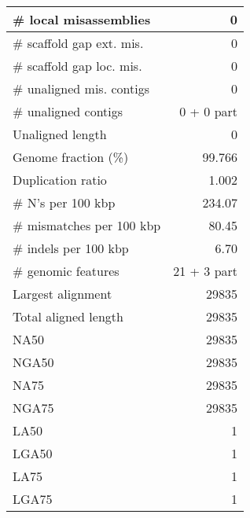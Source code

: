 \documentclass[12pt,a4paper]{article}
\begin{document}
\begin{table}[ht]
\begin{center}
\begin{tabular}{|l*{1}{|r}|}
\# local misassemblies & 0 \\ \hline
\# scaffold gap ext. mis. & 0 \\ \hline
\# scaffold gap loc. mis. & 0 \\ \hline
\# unaligned mis. contigs & 0 \\ \hline
\# unaligned contigs & 0 + 0 part \\ \hline
Unaligned length & 0 \\ \hline
Genome fraction (\%) & 99.766 \\ \hline
Duplication ratio & 1.002 \\ \hline
\# N's per 100 kbp & 234.07 \\ \hline
\# mismatches per 100 kbp & 80.45 \\ \hline
\# indels per 100 kbp & 6.70 \\ \hline
\# genomic features & 21 + 3 part \\ \hline
Largest alignment & 29835 \\ \hline
Total aligned length & 29835 \\ \hline
NA50 & 29835 \\ \hline
NGA50 & 29835 \\ \hline
NA75 & 29835 \\ \hline
NGA75 & 29835 \\ \hline
LA50 & 1 \\ \hline
LGA50 & 1 \\ \hline
LA75 & 1 \\ \hline
LGA75 & 1 \\ \hline
\end{tabular}
\end{center}
\end{table}
\end{document}
